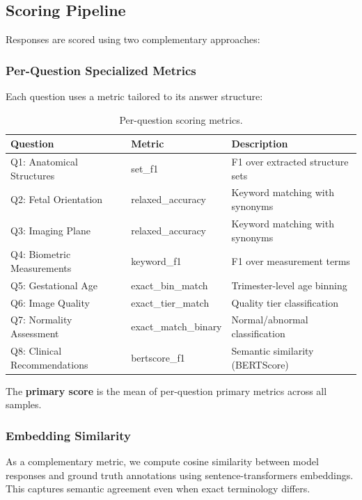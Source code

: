 \documentclass[11pt,a4paper]{article}
\begin{document}
\subsection{Scoring Pipeline}

Responses are scored using two complementary approaches:

\subsubsection{Per-Question Specialized Metrics}

Each question uses a metric tailored to its answer structure:

\begin{table}[H]
\centering
\caption{Per-question scoring metrics.}
\label{tab:metrics}
\begin{tabular}{lll}
\toprule
\textbf{Question} & \textbf{Metric} & \textbf{Description} \\
\midrule
Q1: Anatomical Structures & set\_f1 & F1 over extracted structure sets \\
Q2: Fetal Orientation & relaxed\_accuracy & Keyword matching with synonyms \\
Q3: Imaging Plane & relaxed\_accuracy & Keyword matching with synonyms \\
Q4: Biometric Measurements & keyword\_f1 & F1 over measurement terms \\
Q5: Gestational Age & exact\_bin\_match & Trimester-level age binning \\
Q6: Image Quality & exact\_tier\_match & Quality tier classification \\
Q7: Normality Assessment & exact\_match\_binary & Normal/abnormal classification \\
Q8: Clinical Recommendations & bertscore\_f1 & Semantic similarity (BERTScore) \\
\bottomrule
\end{tabular}
\end{table}

The \textbf{primary score} is the mean of per-question primary metrics across all samples.

\subsubsection{Embedding Similarity}

As a complementary metric, we compute cosine similarity between model responses and ground truth annotations using sentence-transformers embeddings. This captures semantic agreement even when exact terminology differs.
\end{document}
